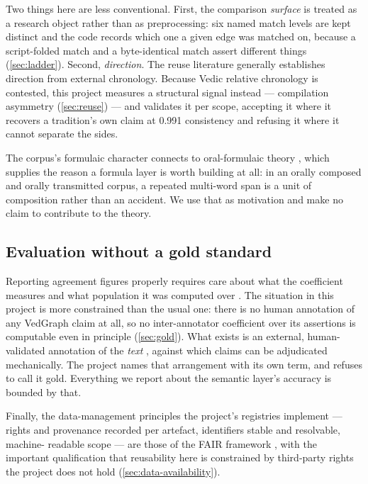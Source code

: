 Two things here are less conventional. First, the comparison \emph{surface} is
treated as a research object rather than as preprocessing: six named match levels
are kept distinct and the code records which one a given edge was matched on,
because a script-folded match and a byte-identical match assert different things
(\cref{sec:ladder}). Second, \emph{direction}. The reuse literature generally
establishes direction from external chronology. Because Vedic relative chronology is
contested, this project measures a structural signal instead --- compilation
asymmetry (\cref{sec:reuse}) --- and validates it per scope, accepting it where it
recovers a tradition's own claim at 0.991 consistency and refusing it where it
cannot separate the sides.

The corpus's formulaic character connects to oral-formulaic theory
\citep{lord1960singer}, which supplies the reason a formula layer is worth building
at all: in an orally composed and orally transmitted corpus, a repeated multi-word
span is a unit of composition rather than an accident. We use that as motivation and
make no claim to contribute to the theory.

\subsection{Evaluation without a gold standard}

Reporting agreement figures properly requires care about what the coefficient
measures and what population it was computed over \citep{artstein2008agreement}. The
situation in this project is more constrained than the usual one: there is no human
annotation of any VedGraph claim at all, so no inter-annotator coefficient over its
assertions is computable even in principle (\cref{sec:gold}). What exists is an
external, human-validated annotation of the \emph{text} \citep{hellwig2020vedic},
against which claims can be adjudicated mechanically. The project names that
arrangement with its own term, and refuses to call it gold. Everything we report
about the semantic layer's accuracy is bounded by that.

Finally, the data-management principles the project's registries implement --- rights
and provenance recorded per artefact, identifiers stable and resolvable, machine-
readable scope --- are those of the FAIR framework \citep{wilkinson2016fair}, with
the important qualification that reusability here is constrained by third-party
rights the project does not hold (\cref{sec:data-availability}).
